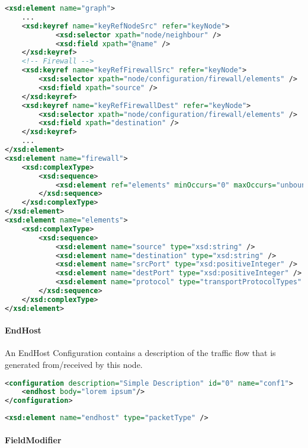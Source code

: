 \begin{lstlisting}[language=XML, caption=Firewall schema code snippet]
<xsd:element name="graph">
    ...
    <xsd:keyref name="keyRefNodeSrc" refer="keyNode">
            <xsd:selector xpath="node/neighbour" />
            <xsd:field xpath="@name" />
    </xsd:keyref>
    <!-- Firewall -->
    <xsd:keyref name="keyRefFirewallSrc" refer="keyNode">
        <xsd:selector xpath="node/configuration/firewall/elements" />
        <xsd:field xpath="source" />
    </xsd:keyref>
    <xsd:keyref name="keyRefFirewallDest" refer="keyNode">
        <xsd:selector xpath="node/configuration/firewall/elements" />
        <xsd:field xpath="destination" />
    </xsd:keyref>
    ...
</xsd:element>
<xsd:element name="firewall">
    <xsd:complexType>
        <xsd:sequence>
            <xsd:element ref="elements" minOccurs="0" maxOccurs="unbounded" />
        </xsd:sequence>
    </xsd:complexType>
</xsd:element>
<xsd:element name="elements">
    <xsd:complexType>
        <xsd:sequence>
            <xsd:element name="source" type="xsd:string" />
            <xsd:element name="destination" type="xsd:string" />
            <xsd:element name="srcPort" type="xsd:positiveInteger" />
            <xsd:element name="destPort" type="xsd:positiveInteger" />
            <xsd:element name="protocol" type="transportProtocolTypes" />
        </xsd:sequence>
    </xsd:complexType>
</xsd:element>
\end{lstlisting}

\paragraph{EndHost} 

An EndHost Configuration contains a description of the traffic flow that is generated from/received by this node.

\begin{lstlisting}[language=XML, caption=EndHost Configuration Example]
<configuration description="Simple Description" id="0" name="conf1">
    <endhost body="lorem ipsum"/>
</configuration>
\end{lstlisting}

\begin{lstlisting}[language=XML, caption=EndHost schema code snippet]
<xsd:element name="endhost" type="packetType" />
\end{lstlisting}

\paragraph{FieldModifier}


